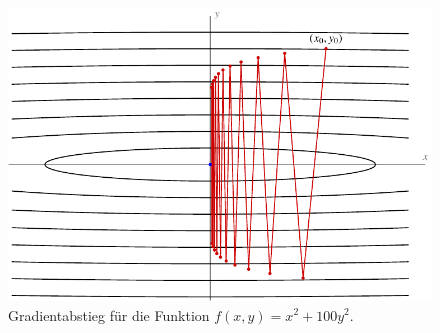 %
%
%
\begin{figure}
\centering
\includegraphics{chapters/070-direkt/images/abstieg.pdf}
\caption{Gradientabstieg für die Funktion $f(x,y)=x^2+100y^2$.
\label{buch:direkt:gradient:fig:abstieg}}
\end{figure}
